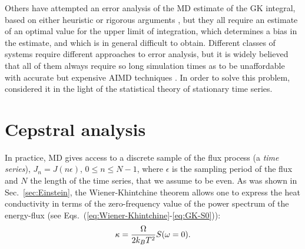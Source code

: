 \begin{LEtext}
Others have attempted an error analysis of the MD estimate of the GK integral, based on either heuristic or rigorous arguments \citep{Jones2012,Wang_gk2017,Oliveira2017}, but they all require an estimate of an optimal value for the upper limit of integration, which determines a bias in the estimate, and which is in general difficult to obtain. Different classes of systems require different approaches to error analysis, but it is widely believed that all of them always require so long simulation times as to be unaffordable with accurate but expensive AIMD techniques \citep{Carbogno:2017gc}. In order to solve this problem, \cite{Ercole2017} considered it in the light of the statistical theory of stationary time series.

\end{LEtext}



\section{Cepstral analysis}  \label{sec:cepstral-analysis}

In practice, MD gives access to a discrete sample of the flux process (a \emph{time series}), $J_n = J(n \epsilon)$, $0 \leq n \leq N-1$, where $\epsilon$ is the sampling period of the flux and $N$ the length of the time series, that we assume to be even. As was shown in Sec.~\ref{sec:Einstein}, the Wiener-Khintchine theorem allows one to express the heat conductivity in terms of the zero-frequency value of the power spectrum of the energy-flux (see Eqs.~(\ref{eq:Wiener-Khintchine}-\ref{eq:GK-S0})):
\begin{equation}
\kappa = \frac{\rOmega}{2k_B T^2} S (\omega=0). \label{eq:kappa-S0}
\end{equation}


